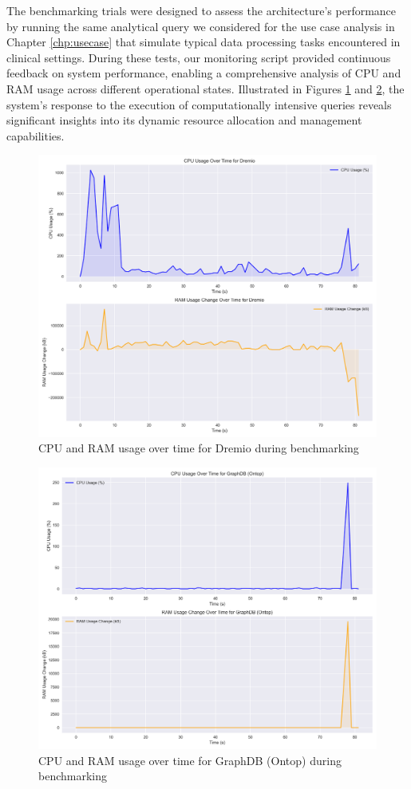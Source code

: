 
The benchmarking trials were designed to assess the architecture's performance by running the same analytical query we considered for the use case analysis in Chapter \ref{chp:usecase} that simulate typical data processing tasks encountered in clinical settings. During these tests, our monitoring script provided continuous feedback on system performance, enabling a comprehensive analysis of CPU and RAM usage across different operational states.
Illustrated in Figures \ref{fig:bench_Dremio} and \ref{fig:bench_GraphDB}, the system's response to the execution of computationally intensive queries reveals significant insights into its dynamic resource allocation and management capabilities.
\begin{figure}[!ht] 
    \centering 
    \includegraphics[width=11.6cm]{res/Dremio_usage_plot.png} 
    \caption{CPU and RAM usage over time for Dremio during benchmarking} 
    \label{fig:bench_Dremio}
\end{figure}
\begin{figure}[!ht] 
    \centering 
    \includegraphics[width=11.6cm]{res/GraphDB (Ontop)_usage_plot.png} 
    \caption{CPU and RAM usage over time for GraphDB (Ontop) during benchmarking} 
    \label{fig:bench_GraphDB}
\end{figure}
